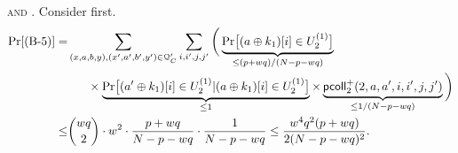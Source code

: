 




%
%
%
%
%







%
%





\noindent\textsc{\bfive and \bsix}. Consider \bfive first.
%
\begin{align*}
\Pr[\text{(B-5)}] 
=   &  \sum_{(x,a,b,y),(x',a',b',y')\in\mathcal{Q}_{C}'}\sum_{i,i',j,j'}\bigg(\underbrace{{\Pr}\big[(a\oplus k_1)[i]\in U_2^{(1)}\big]}_{\leq(p+wq)/(N-p-wq)}     \\
& \ \ \ \ \ \times
\underbrace{{\Pr}\big[(a'\oplus k_1)[i]\in U_2^{(1)}|(a\oplus k_1)[i]\in U_2^{(1)}\big]}_{\leq1}\times\underbrace{\mathsf{pcoll}_{2}^+(2,a,a',i,i',j,j')}_{\leq1/(N-p-wq)}   \bigg)      \\
\leq  &  {wq\choose 2}\cdot w^2\cdot\frac{p+wq}{N-p-wq}\cdot\frac{1}{N-p-wq}\leq
\frac{w^4q^2(p+wq)}{2(N-p-wq)^2}.
\end{align*}
%

